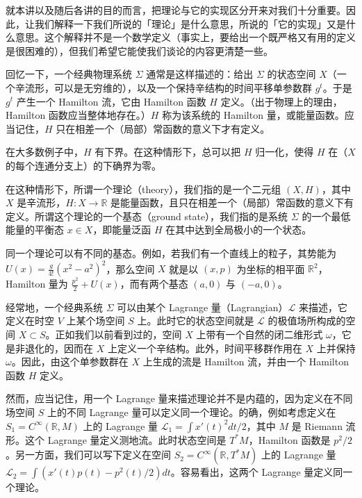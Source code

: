就本讲以及随后各讲的目的而言，把理论与它的实现区分开来对我们十分重要。因此，让我们解释一下我们所说的「理论」是什么意思，所说的「它的实现」又是什么意思。这个解释并不是一个数学定义（事实上，要给出一个既严格又有用的定义是很困难的），但我们希望它能使我们谈论的内容更清楚一些。

回忆一下，一个经典物理系统 $\Sigma$ 通常是这样描述的：给出 $\Sigma$ 的状态空间 $X$（一个辛流形，可以是无穷维的），以及一个保持辛结构的时间平移单参数群 $g^t$。于是 $g^t$ 产生一个 Hamilton 流，它由 Hamilton 函数 $H$ 定义。（出于物理上的理由，Hamilton 函数应当整体地存在。）$H$ 称为该系统的 Hamilton 量，或能量函数。应当记住，$H$ 只在相差一个（局部）常函数的意义下才有定义。

在大多数例子中，$H$ 有下界。在这种情形下，总可以把 $H$ 归一化，使得 $H$ 在（$X$ 的每个连通分支上）的下确界为零。

在这种情形下，所谓一个理论（theory），我们指的是一个二元组 $(X,H)$，其中 $X$ 是辛流形，$H:X\to\mathbb{R}$ 是能量函数，且只在相差一个（局部）常函数的意义下有定义。所谓这个理论的一个基态（ground state），我们指的是系统 $\Sigma$ 的一个最低能量的平衡态 $x\in X$，即能量泛函 $H$ 在其中达到全局极小的一个状态。

同一个理论可以有不同的基态。例如，若我们有一个直线上的粒子，其势能为 $U(x)=\frac{g}{4!}(x^2-a^2)^2$，那么空间 $X$ 就是以 $(x,p)$ 为坐标的相平面 $\mathbb{R}^2$，Hamilton 量为 $\frac{p^2}{2}+U(x)$，而有两个基态 $(a,0)$ 与 $(-a,0)$。

经常地，一个经典系统 $\Sigma$ 可以由某个 Lagrange 量（Lagrangian）$\mathcal{L}$ 来描述，它定义在时空 $V$ 上某个场空间 $S$ 上。此时它的状态空间就是 $\mathcal{L}$ 的极值场所构成的空间 $X\subset S$。正如我们以前看到过的，空间 $X$ 上带有一个自然的闭二维形式 $\omega$，它是非退化的，因而在 $X$ 上定义一个辛结构。此外，时间平移群作用在 $X$ 上并保持 $\omega$。因此，由这个单参数群在 $X$ 上生成的流是 Hamilton 流，并由一个 Hamilton 函数 $H$ 定义。

然而，应当记住，用一个 Lagrange 量来描述理论并不是内蕴的，因为定义在不同场空间 $S$ 上的不同 Lagrange 量可以定义同一个理论。的确，例如考虑定义在 $S_1=C^\infty(\mathbb{R},M)$ 上的 Lagrange 量 $\mathcal{L}_1=\int x'(t)^2dt/2$，其中 $M$ 是 Riemann 流形。这个 Lagrange 量定义测地流。此时状态空间是 $T^*M$，Hamilton 函数是 $p^2/2$。另一方面，我们可以写下定义在空间 $S_2=C^\infty(\mathbb{R},T^*M)$ 上的 Lagrange 量 $\mathcal{L}_2=\int(x'(t)p(t)-p^2(t)/2)dt$。容易看出，这两个 Lagrange 量定义同一个理论。


